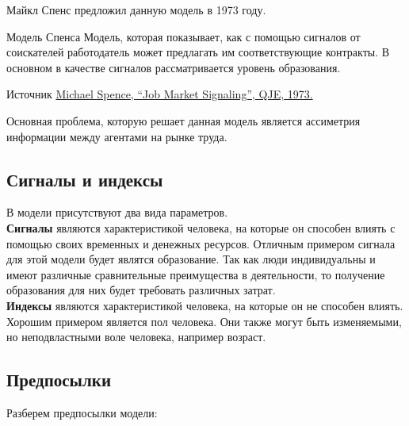 \indent\setlength{\parindent}{1em}Майкл Спенс предложил данную модель в 1973 году.

\begin{mybox}{Модель Спенса}
    Модель, которая показывает, как с помощью сигналов от соискателей работодатель может предлагать им соответствующие
    контракты. В основном в качестве сигналов рассматривается уровень образования.
\end{mybox}

\begin{mybox}{Источник}
    \href{https://www.sfu.ca/~allen/Spence.pdf}{Michael Spence, “Job Market Signaling”, QJE, 1973.}
\end{mybox}

\indent\setlength{\parindent}{1em}Основная проблема, которую решает данная модель является ассиметрия информации между
агентами на рынке труда.

\subsection{Сигналы и индексы}

\indent\setlength{\parindent}{1em}В модели присутствуют два вида параметров.\smallskip\\

\indent\setlength{\parindent}{1em}\textbf{Сигналы} являются характеристикой человека, на которые он способен влиять с
помощью своих временных и денежных ресурсов. Отличным примером сигнала для этой модели будет являтся образование. Так
как люди индивидуальны и имеют различные сравнительные преимущества в деятельности, то получение образования для них
будет требовать различных затрат.\smallskip\\

\indent\setlength{\parindent}{1em}\textbf{Индексы} являются характеристикой человека, на которые он не способен влиять.
Хорошим примером является пол человека. Они также могут быть изменяемыми, но неподвластными воле человека, например
возраст.

\subsection{Предпосылки}

\indent\setlength{\parindent}{1em}Разберем предпосылки модели:

